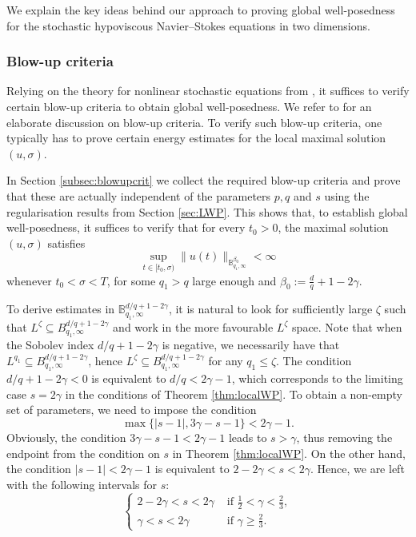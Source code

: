 \documentclass[11pt, a4paper,oneside, reqno]{amsart}
\theoremstyle{remark} %
\theoremstyle{definition} %
\numberwithin{theorem}{section}
\numberwithin{equation}{section}
\newcommand{\BB}{\mathbb{B}}
\newcommand{\half}{\frac{1}{2}}
\newcommand{\gam}{\gamma}
\begin{document}
We explain the key ideas behind our approach to proving global well-posedness for the stochastic hypoviscous Navier--Stokes equations in two dimensions. 

\subsubsection{Blow-up criteria} Relying on the theory for nonlinear stochastic equations from \cite{AV25_survey}, it suffices to verify certain blow-up criteria to obtain global well-posedness. We refer to \cite[Section 5]{AV25_survey} for an elaborate discussion on blow-up criteria. To verify such blow-up criteria, one typically has to prove certain energy estimates for the local maximal solution $(u, \sigma)$. 

In Section \ref{subsec:blowupcrit} we collect the required blow-up criteria and prove that these are actually independent of the parameters $p,q$ and $s$ using the regularisation results from Section \ref{sec:LWP}. This shows that, to establish
global well-posedness, it suffices to verify that for every $t_0 > 0$, the maximal solution $(u, \sigma)$ satisfies 
\begin{equation*}
    \sup_{t\in [t_0, \sigma)} \|u(t)\|_{\mathbb{B}^{\beta_0}_{q_1, \infty}}<\infty
\end{equation*}
whenever $ t_0<\sigma<T$, for some $q_1>q$ large enough and $\beta_0:= \frac{d}{q}+1-2\gam$.  

To derive estimates in $\BB^{d/q+1-2\gam}_{q_1,\infty}$, it is natural to look for sufficiently large $\zeta$ such that $L^\zeta \subseteq B^{d/q+1-2\gam}_{q_1,\infty}$ and work in the more favourable $L^\zeta$ space. Note that when the Sobolev index $d/q+1-2\gam$ is negative, we necessarily have that
$L^{q_1} \subseteq B^{d/q+1-2\gam}_{q_1,\infty} $,
hence $L^\zeta \subseteq B^{d/q+1-2\gam}_{q_1,\infty}$ for any $q_1 \leq \zeta$. The condition $d/q+1-2\gam<0$ is equivalent to $d/q< 2\gam-1$, which corresponds to the limiting case $s = 2\gamma$ in the conditions of Theorem \ref{thm:localWP}. To obtain a non-empty set of parameters, we need to impose the condition
\begin{equation*}
    \max\{|s-1|, 3\gam-s-1\}< 2\gam-1.
\end{equation*}
Obviously, the condition $3\gam-s-1<2\gam -1$ leads to $s>\gam$, thus removing the endpoint from the condition on $s$ in Theorem \ref{thm:localWP}. On the other hand, the condition $|s-1|<2\gam-1$ is equivalent to $2-2\gam<s<2\gam$. Hence, we are left with the following intervals for $s$:
\begin{equation*}
    \begin{cases}
        2-2\gam<s<2\gam &\mbox{ if } \half < \gam< \frac 23,\\
        \gam<s<2\gam&\mbox{ if } \gam\geq \frac 23.
    \end{cases}
\end{equation*}
\end{document}
